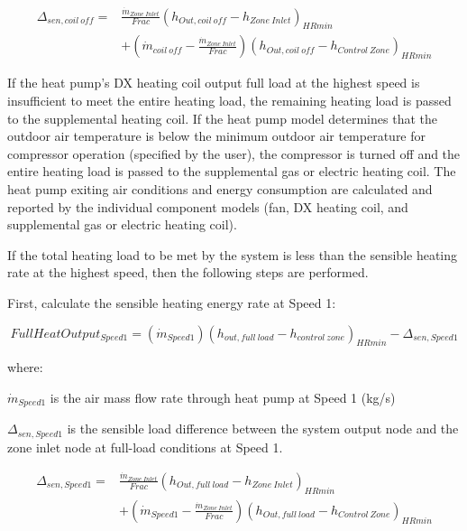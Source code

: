 \begin{equation}
\begin{array}{rl}
{\Delta_{sen,coil~off}} =& \frac{{{{\dot m}_{Zone~Inlet}}}}{{Frac}}{\left( {{h_{Out,coil~off}} - {h_{Zone~Inlet}}} \right)_{HRmin}} \\
 & + \left( {{{\dot m}_{coil~off}} - \frac{{{{\dot m}_{Zone~Inlet}}}}{{Frac}}} \right){\left( {{h_{Out,coil~off}} - {h_{Control~Zone}}} \right)_{HRmin}}
\end{array}
\end{equation}

If the heat pump's DX heating coil output full load at the highest speed is insufficient to meet the entire heating load, the remaining heating load is passed to the supplemental heating coil. If the heat pump model determines that the outdoor air temperature is below the minimum outdoor air temperature for compressor operation (specified by the user), the compressor is turned off and the entire heating load is passed to the supplemental gas or electric heating coil. The heat pump exiting air conditions and energy consumption are calculated and reported by the individual component models (fan, DX heating coil, and supplemental gas or electric heating coil).

If the total heating load to be met by the system is less than the sensible heating rate at the highest speed, then the following steps are performed.

First, calculate the sensible heating energy rate at Speed 1:

\begin{equation}
FullHeatOutpu{t_{Speed1}} = \left( {{{\dot m}_{Speed1}}} \right){\left( {{h_{out,full~load}} - {h_{control~zone}}} \right)_{HRmin}} - {\Delta_{sen,Speed1}}
\end{equation}

where:

\({{{\dot m}_{Speed1}}}\) is the air mass flow rate through heat pump at Speed 1 (kg/s)

\(\Delta_{sen,Speed1}\) is the sensible load difference between the system output node and the zone inlet node at full-load conditions at Speed 1.

\begin{equation}
\begin{array}{rl}
{\Delta_{sen,Speed1}} =& \frac{{{{\dot m}_{Zone~Inlet}}}}{{Frac}}{\left( {{h_{Out,full~load}} - {h_{Zone~Inlet}}} \right)_{HRmin}} \\
 & + \left( {{{\dot m}_{Speed1}} - \frac{{{{\dot m}_{Zone~Inlet}}}}{{Frac}}} \right){\left( {{h_{Out,full~load}} - {h_{Control~Zone}}} \right)_{HRmin}}
\end{array}
\end{equation}

